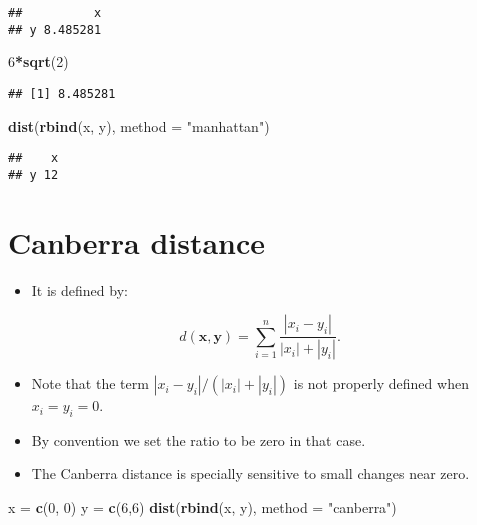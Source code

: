 \documentclass[
]{article}
\newenvironment{Shaded}{\begin{snugshade}}{\end{snugshade}}
\newcommand{\DataTypeTok}[1]{\textcolor[rgb]{0.13,0.29,0.53}{#1}}
\newcommand{\DecValTok}[1]{\textcolor[rgb]{0.00,0.00,0.81}{#1}}
\newcommand{\KeywordTok}[1]{\textcolor[rgb]{0.13,0.29,0.53}{\textbf{#1}}}
\newcommand{\NormalTok}[1]{#1}
\newcommand{\OperatorTok}[1]{\textcolor[rgb]{0.81,0.36,0.00}{\textbf{#1}}}
\newcommand{\StringTok}[1]{\textcolor[rgb]{0.31,0.60,0.02}{#1}}
\providecommand{\tightlist}{%
  \setlength{\itemsep}{0pt}\setlength{\parskip}{0pt}}
\begin{document}
\begin{verbatim}
##          x
## y 8.485281
\end{verbatim}

\begin{Shaded}
\begin{Highlighting}[]
\DecValTok{6}\OperatorTok{*}\KeywordTok{sqrt}\NormalTok{(}\DecValTok{2}\NormalTok{)}
\end{Highlighting}
\end{Shaded}

\begin{verbatim}
## [1] 8.485281
\end{verbatim}

\begin{Shaded}
\begin{Highlighting}[]
\KeywordTok{dist}\NormalTok{(}\KeywordTok{rbind}\NormalTok{(x, y), }\DataTypeTok{method =} \StringTok{"manhattan"}\NormalTok{)}
\end{Highlighting}
\end{Shaded}

\begin{verbatim}
##    x
## y 12
\end{verbatim}

\hypertarget{canberra-distance}{%
\section{Canberra distance}\label{canberra-distance}}

\begin{itemize}
\tightlist
\item
  It is defined by:
\end{itemize}

\[d(\mathbf{x},\mathbf{y})
=\sum_{i=1}^n \frac{|x_i-y_i|}{|x_i|+|y_i|}.\]

\begin{itemize}
\tightlist
\item
  Note that the term \(|x_i − y_i|/(|x_i|+|y_i|)\) is not properly
  defined when \(x_i=y_i=0\).
\item
  By convention we set the ratio to be zero in that case.
\item
  The Canberra distance is specially sensitive to small changes near
  zero.
\end{itemize}

\begin{Shaded}
\begin{Highlighting}[]
\NormalTok{x =}\StringTok{ }\KeywordTok{c}\NormalTok{(}\DecValTok{0}\NormalTok{, }\DecValTok{0}\NormalTok{)}
\NormalTok{y =}\StringTok{ }\KeywordTok{c}\NormalTok{(}\DecValTok{6}\NormalTok{,}\DecValTok{6}\NormalTok{)}
\KeywordTok{dist}\NormalTok{(}\KeywordTok{rbind}\NormalTok{(x, y), }\DataTypeTok{method =} \StringTok{"canberra"}\NormalTok{)}
\end{Highlighting}
\end{Shaded}
\end{document}

